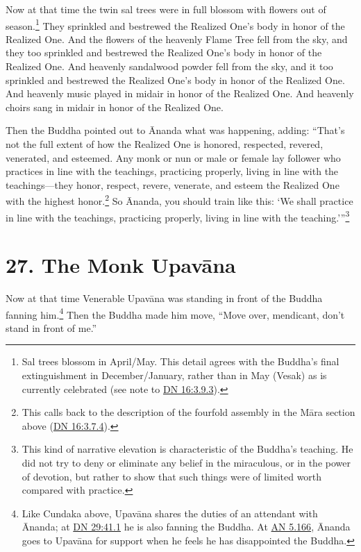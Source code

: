\documentclass[12pt,openany]{book}%
\begin{document}
Now at that time the twin sal trees were in full blossom with flowers out of season.\footnote{Sal trees blossom in April/May. This detail agrees with the Buddha’s final extinguishment in December/January, rather than in May (Vesak) as is currently celebrated (see note to \href{https://suttacentral.net/dn16/en/sujato\#3.9.3}{DN 16:3.9.3}). } They sprinkled and bestrewed the Realized One’s body in honor of the Realized One. And the flowers of the heavenly Flame Tree fell from the sky, and they too sprinkled and bestrewed the Realized One’s body in honor of the Realized One. And heavenly sandalwood powder fell from the sky, and it too sprinkled and bestrewed the Realized One’s body in honor of the Realized One. And heavenly music played in midair in honor of the Realized One. And heavenly choirs sang in midair in honor of the Realized One. 

Then the Buddha pointed out to Ānanda what was happening, adding: “That’s not the full extent of how the Realized One is honored, respected, revered, venerated, and esteemed. Any monk or nun or male or female lay follower who practices in line with the teachings, practicing properly, living in line with the teachings—they honor, respect, revere, venerate, and esteem the Realized One with the highest honor.\footnote{This calls back to the description of the fourfold assembly in the \textsanskrit{Māra} section above (\href{https://suttacentral.net/dn16/en/sujato\#3.7.4}{DN 16:3.7.4}). } So Ānanda, you should train like this: ‘We shall practice in line with the teachings, practicing properly, living in line with the teaching.’”\footnote{This kind of narrative elevation is characteristic of the Buddha’s teaching. He did not try to deny or eliminate any belief in the miraculous, or in the power of devotion, but rather to show that such things were of limited worth compared with practice. } 

\section*{27. The Monk \textsanskrit{Upavāna} }

Now at that time Venerable \textsanskrit{Upavāna} was standing in front of the Buddha fanning him.\footnote{Like Cundaka above, \textsanskrit{Upavāna} shares the duties of an attendant with Ānanda; at \href{https://suttacentral.net/dn29/en/sujato\#41.1}{DN 29:41.1} he is also fanning the Buddha. At \href{https://suttacentral.net/an5.166/en/sujato}{AN 5.166}, Ānanda goes to \textsanskrit{Upavāna} for support when he feels he has disappointed the Buddha. } Then the Buddha made him move, “Move over, mendicant, don’t stand in front of me.” 
\end{document}
